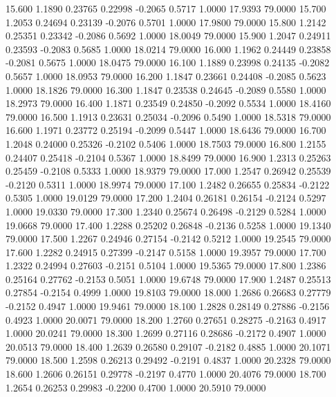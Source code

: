   15.600   1.1890   0.23765   0.22998  -0.2065   0.5717   1.0000  17.9393  79.0000
  15.700   1.2053   0.24694   0.23139  -0.2076   0.5701   1.0000  17.9800  79.0000
  15.800   1.2142   0.25351   0.23342  -0.2086   0.5692   1.0000  18.0049  79.0000
  15.900   1.2047   0.24911   0.23593  -0.2083   0.5685   1.0000  18.0214  79.0000
  16.000   1.1962   0.24449   0.23858  -0.2081   0.5675   1.0000  18.0475  79.0000
  16.100   1.1889   0.23998   0.24135  -0.2082   0.5657   1.0000  18.0953  79.0000
  16.200   1.1847   0.23661   0.24408  -0.2085   0.5623   1.0000  18.1826  79.0000
  16.300   1.1847   0.23538   0.24645  -0.2089   0.5580   1.0000  18.2973  79.0000
  16.400   1.1871   0.23549   0.24850  -0.2092   0.5534   1.0000  18.4160  79.0000
  16.500   1.1913   0.23631   0.25034  -0.2096   0.5490   1.0000  18.5318  79.0000
  16.600   1.1971   0.23772   0.25194  -0.2099   0.5447   1.0000  18.6436  79.0000
  16.700   1.2048   0.24000   0.25326  -0.2102   0.5406   1.0000  18.7503  79.0000
  16.800   1.2155   0.24407   0.25418  -0.2104   0.5367   1.0000  18.8499  79.0000
  16.900   1.2313   0.25263   0.25459  -0.2108   0.5333   1.0000  18.9379  79.0000
  17.000   1.2547   0.26942   0.25539  -0.2120   0.5311   1.0000  18.9974  79.0000
  17.100   1.2482   0.26655   0.25834  -0.2122   0.5305   1.0000  19.0129  79.0000
  17.200   1.2404   0.26181   0.26154  -0.2124   0.5297   1.0000  19.0330  79.0000
  17.300   1.2340   0.25674   0.26498  -0.2129   0.5284   1.0000  19.0668  79.0000
  17.400   1.2288   0.25202   0.26848  -0.2136   0.5258   1.0000  19.1340  79.0000
  17.500   1.2267   0.24946   0.27154  -0.2142   0.5212   1.0000  19.2545  79.0000
  17.600   1.2282   0.24915   0.27399  -0.2147   0.5158   1.0000  19.3957  79.0000
  17.700   1.2322   0.24994   0.27603  -0.2151   0.5104   1.0000  19.5365  79.0000
  17.800   1.2386   0.25164   0.27762  -0.2153   0.5051   1.0000  19.6748  79.0000
  17.900   1.2487   0.25513   0.27854  -0.2154   0.4999   1.0000  19.8103  79.0000
  18.000   1.2686   0.26683   0.27779  -0.2152   0.4947   1.0000  19.9461  79.0000
  18.100   1.2828   0.28149   0.27886  -0.2156   0.4923   1.0000  20.0071  79.0000
  18.200   1.2760   0.27651   0.28275  -0.2163   0.4917   1.0000  20.0241  79.0000
  18.300   1.2699   0.27116   0.28686  -0.2172   0.4907   1.0000  20.0513  79.0000
  18.400   1.2639   0.26580   0.29107  -0.2182   0.4885   1.0000  20.1071  79.0000
  18.500   1.2598   0.26213   0.29492  -0.2191   0.4837   1.0000  20.2328  79.0000
  18.600   1.2606   0.26151   0.29778  -0.2197   0.4770   1.0000  20.4076  79.0000
  18.700   1.2654   0.26253   0.29983  -0.2200   0.4700   1.0000  20.5910  79.0000
